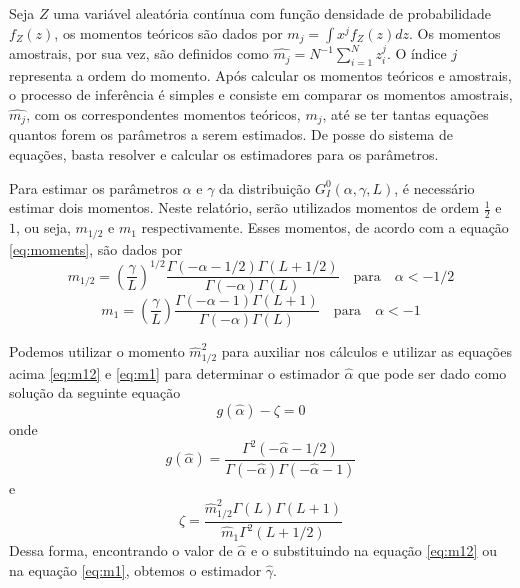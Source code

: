 \documentclass[12pt]{article}
\begin{document}
Seja $Z$ uma variável aleatória contínua com função densidade de probabilidade $f_Z(z)$, os momentos teóricos são dados por $m_j = \int x^jf_Z(z)dz$. Os momentos amostrais, por sua vez, são definidos como $\widehat{m_j} = N^{-1}\sum_{i=1}^{N}z_i^j$. O índice $\textit{j}$ representa a ordem do momento. Após calcular os momentos teóricos e amostrais, o processo de inferência é simples e consiste em comparar os momentos amostrais, $\widehat{m_j}$, com os correspondentes momentos teóricos, $m_j$, até se ter tantas equações quantos forem os parâmetros a serem estimados. De posse do sistema de equações, basta resolver e calcular os estimadores para os parâmetros.

Para estimar os parâmetros $\alpha$ e $\gamma$ da distribuição $G_I^0(\alpha, \gamma, L)$, é necessário estimar dois momentos. Neste relatório, serão utilizados momentos de ordem $\frac{1}{2}$ e $1$, ou seja, $m_{1/2}$ e $m_1$ respectivamente. Esses momentos, de acordo com a equação \eqref{eq:moments}, são dados por
\begin{equation}
    m_{1/2} = \left ( \frac{\gamma}{L}\right )^{1/2} \frac{\Gamma(-\alpha-1/2)\Gamma(L+1/2)}{\Gamma(-\alpha)\Gamma(L)} \quad \text{para} \quad \alpha < -1/2 \label{eq:m12}
\end{equation}
\begin{equation}
    m_{1} = \left ( \frac{\gamma}{L}\right ) \frac{\Gamma(-\alpha-1)\Gamma(L+1)}{\Gamma(-\alpha)\Gamma(L)} \quad \text{para} \quad \alpha < -1 \label{eq:m1}
\end{equation}

Podemos utilizar o momento $\widehat{m}_{1/2}^2$ para auxiliar nos cálculos e utilizar as equações acima \eqref{eq:m12} e \eqref{eq:m1} para determinar o estimador $\widehat{\alpha}$ que pode ser dado como solução da seguinte equação
\begin{equation}
    g(\widehat{\alpha}) - \zeta = 0
\end{equation}
onde 
\begin{equation}
    g(\widehat{\alpha}) = \frac{\Gamma^2(-\widehat{\alpha} - 1/2)}{\Gamma(-\widehat{\alpha})\Gamma(-\widehat{\alpha} - 1)}
\end{equation}
e
\begin{equation}
    \zeta = \frac{\widehat{m}_{1/2}^2\Gamma(L)\Gamma(L+1)}{\widehat{m}_{1}\Gamma^2(L+1/2)}
\end{equation}
Dessa forma, encontrando o valor de $\widehat{\alpha}$ e o substituindo na equação \eqref{eq:m12} ou na equação \eqref{eq:m1}, obtemos o estimador $\widehat{\gamma}$.
\end{document}
